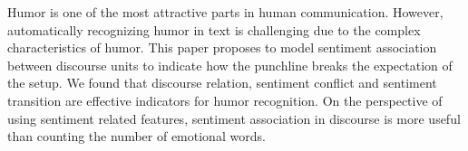 Humor is one of the most attractive parts in human communication. However, automatically recognizing humor in text is challenging due to the complex characteristics of humor. This paper proposes to model sentiment association between discourse units to indicate how the punchline breaks the expectation of the setup. We found that discourse relation, sentiment conflict and sentiment transition are effective indicators for humor recognition. On the perspective of using sentiment related features, sentiment association in discourse is more useful than counting the number of emotional words.
